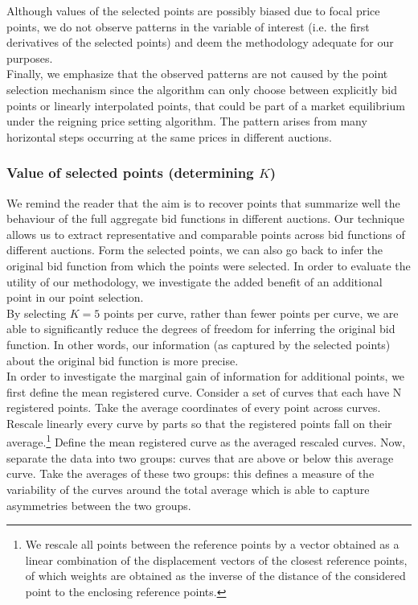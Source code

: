 Although values of the selected points are possibly biased due to focal price points, we do not observe patterns in the variable of interest (i.e. the first derivatives of the selected points) and deem the methodology adequate for our purposes. \\

Finally, we emphasize that the observed patterns are not caused by the point selection mechanism since the algorithm can only choose between explicitly bid points or linearly interpolated points, that could be part of a market equilibrium under the reigning price setting algorithm. The pattern arises from many horizontal steps occurring at the same prices in different auctions. 


\subsubsection{Value of selected points (determining $K$)
}
We remind the reader that the aim is to recover points that summarize well the behaviour of the full aggregate bid functions in different auctions. 
Our technique allows us to extract representative and comparable points across bid functions of different auctions. Form the selected points, we can also go back to infer the original bid function from which the points were selected. In order to evaluate the utility of our methodology, we investigate the added benefit of an additional point in our point selection. \\

By selecting $K=5$ points per curve, rather than fewer points per curve, we are able to significantly reduce the degrees of freedom for inferring the original bid function. In other words, our information (as captured by the selected points) about the original bid function is more precise. \\

In order to investigate the marginal gain of information for additional points, we first define the mean registered curve. Consider a set of curves that each have N registered points. Take the average coordinates of every point across curves. Rescale linearly every curve by parts so that the registered points fall on their average.\footnote{We rescale all points between the reference points by a vector obtained as a linear combination of the displacement vectors of the closest reference points, of which weights are obtained as the inverse of the distance of the considered point to the enclosing reference points.} Define the mean registered curve as the averaged rescaled curves. Now, separate the data into two groups: curves that are above or below this average curve. Take the averages of these two groups: this defines a measure of the variability of the curves around the total average which is able to capture asymmetries between the two groups.\\

